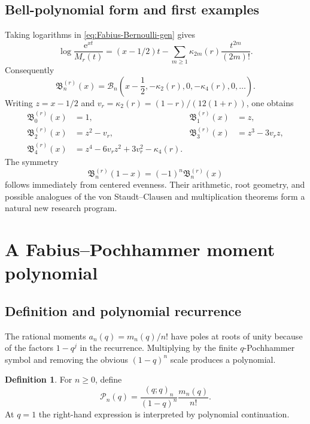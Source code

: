 \documentclass[11pt,oneside]{article}
\numberwithin{equation}{section}
\theoremstyle{definition}
\newtheorem{definition}[theorem]{Definition}
\theoremstyle{remark}
\newcommand{\e}{\mathrm e}
\newcommand{\Bell}{\mathcal B}
\newcommand{\Br}{\mathfrak B}
\begin{document}
\subsection{Bell-polynomial form and first examples}

Taking logarithms in \eqref{eq:Fabius-Bernoulli-gen} gives
\begin{equation}
 \log\frac{\e^{xt}}{M_r(t)}
 =(x-1/2)t-
 \sum_{m\ge1}\kappa_{2m}(r)\frac{t^{2m}}{(2m)!}.
 \label{eq:Appell-log}
\end{equation}
Consequently
\begin{equation}
 \boxed{
 \Br_n^{(r)}(x)=
 \Bell_n\left(x-\frac12,-\kappa_2(r),0,-\kappa_4(r),0,\ldots\right).}
 \label{eq:Appell-Bell}
\end{equation}
Writing $z=x-1/2$ and
$v_r=\kappa_2(r)=(1-r)/(12(1+r))$, one obtains
\begin{align}
 \Br_0^{(r)}(x)&=1,
 &\Br_1^{(r)}(x)&=z,\nonumber\\
 \Br_2^{(r)}(x)&=z^2-v_r,
 &\Br_3^{(r)}(x)&=z^3-3v_rz,\nonumber\\
 \Br_4^{(r)}(x)&=z^4-6v_rz^2+3v_r^2-\kappa_4(r).
 \label{eq:Appell-first}
\end{align}
The symmetry
\begin{equation}
 \Br_n^{(r)}(1-x)=(-1)^n\Br_n^{(r)}(x)
 \label{eq:Appell-reflection}
\end{equation}
follows immediately from centered evenness.  Their arithmetic, root geometry,
and possible analogues of the von Staudt--Clausen and multiplication theorems
form a natural new research program.

\section{A Fabius--Pochhammer moment polynomial}
\label{sec:moment-polynomial}

\subsection{Definition and polynomial recurrence}

The rational moments $a_n(q)=m_n(q)/n!$ have poles at roots of unity because of
the factors $1-q^j$ in the recurrence.  Multiplying by the finite
$q$-Pochhammer symbol and removing the obvious $(1-q)^n$ scale produces a
polynomial.

\begin{definition}
For $n\ge0$, define
\begin{equation}
 \boxed{
 \mathcal P_n(q)=
 \frac{(q;q)_n}{(1-q)^n}\frac{m_n(q)}{n!}.}
 \label{eq:Pn-def}
\end{equation}
At $q=1$ the right-hand expression is interpreted by polynomial continuation.
\end{definition}
\end{document}
